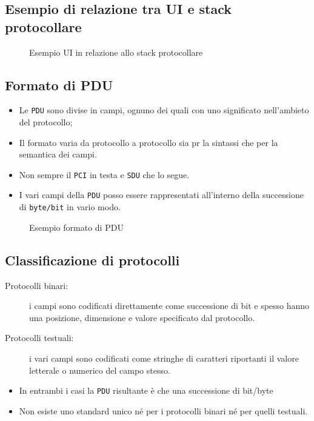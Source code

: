 \subsection{Esempio di relazione tra UI e stack protocollare}
\label{sec:esstackprotpac}

\begin{figure}[ht!]
  \centering
   \resizebox{14cm}{!} {}
  \caption{Esempio UI in relazione allo stack protocollare}
  \label{fig:esrelUIstackprot}
\end{figure}

\subsection{Formato di PDU}
\label{sec:formatodipdu}

\begin{itemize}
\item Le \texttt{PDU} sono divise in campi, ognuno dei quali con uno significato nell'ambieto del protocollo;
\item Il formato varia da protocollo a protocollo sia pr la sintassi che per la semantica dei campi.
\item Non sempre il \texttt{PCI} in testa e \texttt{SDU} che lo segue.
\item I vari campi della \texttt{PDU} posso essere rappresentati all'interno della successione di
  \texttt{byte/bit} in vario modo.
\end{itemize}
\begin{figure}[ht!]
  \centering
   \resizebox{10cm}{!} {}
  \caption{Esempio formato di PDU}
  \label{fig:espdu}
\end{figure}

\subsection{Classificazione di protocolli}
\label{sec:classprot}

\begin{description}
\item[Protocolli binari:] 
  i campi sono codificati direttamente come successione di bit e spesso hanno una posizione, dimensione e
  valore specificato dal protocollo.
\item[Protocolli testuali:] i vari campi sono codificati come stringhe di caratteri riportanti il valore letterale
  o numerico del campo stesso.
\end{description}
\begin{itemize}
\item In entrambi i casi la \texttt{PDU} risultante è che una successione di bit/byte
\item Non esiste uno standard unico né per i protocolli binari né per quelli testuali.
\end{itemize}
